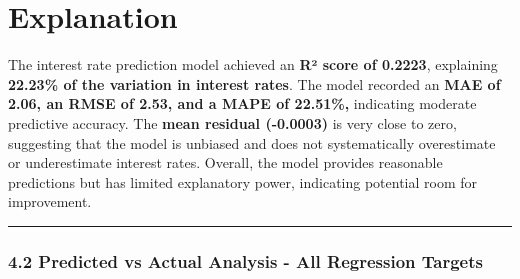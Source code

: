 \documentclass[11pt]{article}
\begin{document}
    \section{Explanation}\label{explanation}

The interest rate prediction model achieved an \textbf{R² score of
0.2223}, explaining \textbf{22.23\% of the variation in interest rates}.
The model recorded an \textbf{MAE of 2.06, an RMSE of 2.53, and a MAPE
of 22.51\%,} indicating moderate predictive accuracy. The \textbf{mean
residual (-0.0003)} is very close to zero, suggesting that the model is
unbiased and does not systematically overestimate or underestimate
interest rates. Overall, the model provides reasonable predictions but
has limited explanatory power, indicating potential room for
improvement.

    \begin{center}\rule{0.5\linewidth}{0.5pt}\end{center}

\subsubsection{4.2 Predicted vs Actual Analysis - All Regression
Targets}\label{predicted-vs-actual-analysis---all-regression-targets}
\end{document}
